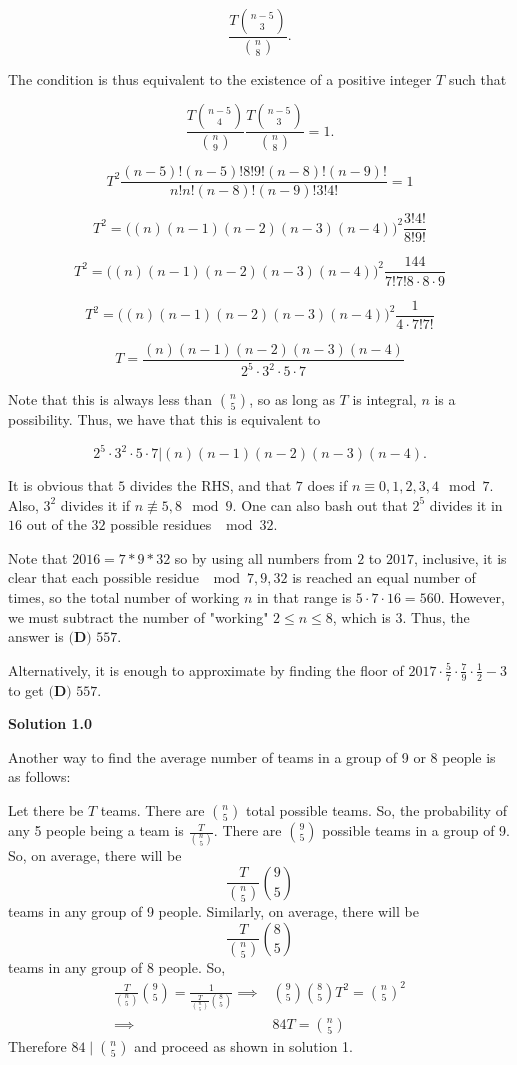 \begin{enumerate}
 
 \[\frac{T{n-5\choose 3}}{{n\choose 8}}.\]

 The condition is thus equivalent to the existence of a positive integer $T$ such that

 
 \[\frac{T{n-5\choose 4}}{{n\choose 9}}\frac{T{n-5\choose 3}}{{n\choose 8}} = 1.\]

 \[T^2\frac{(n-5)!(n-5)!8!9!(n-8)!(n-9)!}{n!n!(n-8)!(n-9)!3!4!} = 1\]

 \[T^2 = \big((n)(n-1)(n-2)(n-3)(n-4)\big)^2 \frac{3!4!}{8!9!}\]

 \[T^2 = \big((n)(n-1)(n-2)(n-3)(n-4)\big)^2 \frac{144}{7!7!8\cdot8\cdot9}\]

 \[T^2 = \big((n)(n-1)(n-2)(n-3)(n-4)\big)^2 \frac{1}{4\cdot7!7!}\]

 \[T = \frac{(n)(n-1)(n-2)(n-3)(n-4)}{2^5\cdot3^2\cdot5\cdot7}\]

 Note that this is always less than ${n\choose 5}$, so as long as $T$ is integral, $n$ is a possibility. Thus, we have that this is equivalent to 

 
 \[2^5\cdot3^2\cdot5\cdot7\big|(n)(n-1)(n-2)(n-3)(n-4).\]

 It is obvious that $5$ divides the RHS, and that $7$ does if $n\equiv 0,1,2,3,4\mod 7$. Also, $3^2$ divides it if $n\not\equiv 5,8\mod 9$. One can also bash out that $2^5$ divides it in $16$ out of the $32$ possible residues $\mod 32$. 

 Note that $2016 = 7*9*32$ so by using all numbers from $2$ to $2017$, inclusive, it is clear that each possible residue $\mod 7,9,32$ is reached an equal number of times, so the total number of working $n$ in that range is $5\cdot 7\cdot 16 = 560$. However, we must subtract the number of "working" $2\leq n\leq 8$, which is $3$. Thus, the answer is $\boxed{\textbf{(D) } 557}$.

 Alternatively, it is enough to approximate by finding the floor of $2017 \cdot \frac57 \cdot \frac79 \cdot \frac12 - 3$ to get $\boxed{\textbf{(D) } 557}$.

 



\textbf{Solution 1.0}

Another way to find the average number of teams in a group of 9 or 8 people is as follows:

 Let there be $T$ teams. There are $\binom{n}{5}$ total possible teams. So, the probability of any 5 people being a team is $\frac{T}{\binom{n}{5}}$. There are $\binom{9}{5}$ possible teams in a group of 9. So, on average, there will be 
 \[\frac{T}{\binom{n}{5}} \binom{9}{5}\]teams in any group of 9 people. Similarly, on average, there will be
 \[\frac{T}{\binom{n}{5}} \binom{8}{5}\]teams in any group of 8 people. So,\begin{align*}\frac{T}{\binom{n}{5}} \binom{9}{5} = \frac{1}{\frac{T}{\binom{n}{5}} \binom{8}{5}} \implies& \binom{9}{5}\binom{8}{5} T^2 = \binom{n}{5}^2 \\\implies& 84T = \binom{n}{5}\end{align*}
Therefore $84 \mid \binom{n}{5}$ and proceed as shown in solution 1.


\end{enumerate}
